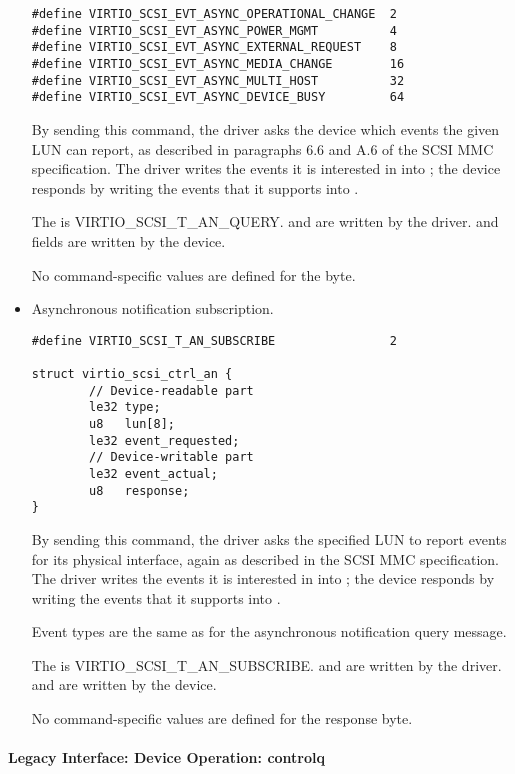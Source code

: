 \begin{itemize}
\begin{lstlisting}
#define VIRTIO_SCSI_EVT_ASYNC_OPERATIONAL_CHANGE  2
#define VIRTIO_SCSI_EVT_ASYNC_POWER_MGMT          4
#define VIRTIO_SCSI_EVT_ASYNC_EXTERNAL_REQUEST    8
#define VIRTIO_SCSI_EVT_ASYNC_MEDIA_CHANGE        16
#define VIRTIO_SCSI_EVT_ASYNC_MULTI_HOST          32
#define VIRTIO_SCSI_EVT_ASYNC_DEVICE_BUSY         64
\end{lstlisting}

  By sending this command, the driver asks the device which
  events the given LUN can report, as described in paragraphs 6.6
  and A.6 of the SCSI MMC specification. The driver writes the
  events it is interested in into ; the device
  responds by writing the events that it supports into
  .

  The  is VIRTIO_SCSI_T_AN_QUERY.  and 
  are written by the driver.  and 
  fields are written by the device.

  No command-specific values are defined for the  byte.

\item Asynchronous notification subscription.
\begin{lstlisting}
#define VIRTIO_SCSI_T_AN_SUBSCRIBE                2

struct virtio_scsi_ctrl_an {
        // Device-readable part
        le32 type;
        u8   lun[8];
        le32 event_requested;
        // Device-writable part
        le32 event_actual;
        u8   response;
}
\end{lstlisting}

  By sending this command, the driver asks the specified LUN to
  report events for its physical interface, again as described in
  the SCSI MMC specification. The driver writes the events it is
  interested in into ; the device responds by
  writing the events that it supports into .

  Event types are the same as for the asynchronous notification
  query message.

  The  is VIRTIO_SCSI_T_AN_SUBSCRIBE.  and
   are written by the driver.
   and  are written by the device.

  No command-specific values are defined for the response byte.
\end{itemize}

\paragraph{Legacy Interface: Device Operation: controlq}\label{sec:Device Types / SCSI Host Device / Device Operation / Device Operation: controlq / Legacy Interface: Device Operation: controlq}

